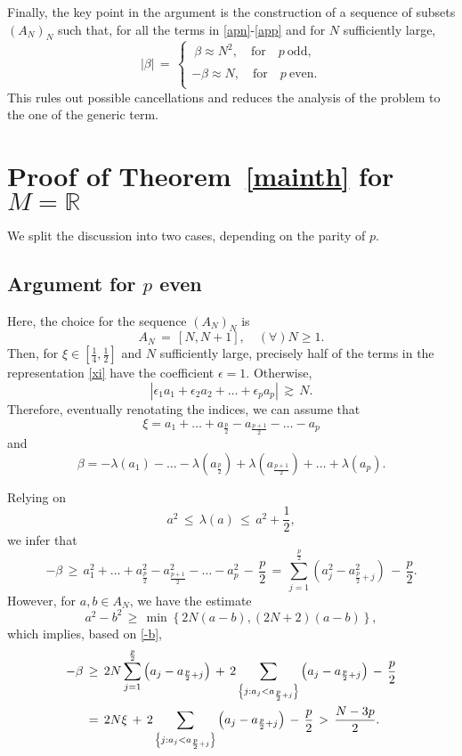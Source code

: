 \documentclass{amsart}
\newcommand{\R}{\mathbb{R}}
\begin{document}
Finally, the key point in the argument is the construction of a sequence of subsets $(A_N)_N$ such that, for all the terms in \eqref{apn}-\eqref{app} and for $N$ sufficiently large,
\begin{equation}
 |\beta|\,=\, \left\{
\begin{array}{l}
\ \beta \approx N^{2}, \quad \text{for} \quad p \ \text{odd},\\
\\
-\beta \approx N, \quad \text{for} \quad p \ \text{even}.\\
\end{array}\right.
\end{equation}
This rules out possible cancellations and reduces the analysis of the problem to the one of the generic term.

\section{Proof of Theorem~\ref{mainth} for $M=\R$}

We split the discussion into two cases, depending on the parity of $p$.

\subsection{Argument for $p$ even}
Here, the choice for the sequence $(A_N)_N$ is 
\[
A_N\,=\,[N,N+1], \quad (\forall) N \geq 1.
\]
Then, for $\xi \in \left[\frac{1}{4},\frac{1}{2}\right]$ and $N$ sufficiently large, precisely half of the terms in the representation \eqref{xi} have the coefficient $\epsilon =1$. Otherwise,
\[
\left|\epsilon_1 a_1+\epsilon_2 a_2+ \ldots+\epsilon_p a_p\right|\,\gtrsim\,N.\]
Therefore, eventually renotating the indices, we can assume that
\[
\xi=a_1+ \ldots+ a_{\frac p2} - a_{\frac{p+1}{2}}-\ldots-a_p 
\]
and 
\[
\beta=-\lambda(a_1)- \ldots- \lambda(a_{\frac p2}) + \lambda(a_{\frac{p+1}{2}})+\ldots+ \lambda(a_p). 
\]

Relying on 
\[
a^2\,\leq\,\lambda (a)\,\leq\, a^2 +\frac 12,
\]
we infer that
\begin{equation}
-\beta\,\geq\, a^2_1+ \ldots+ a^2_{\frac p2} - a^2_{\frac{p+1}{2}}-\ldots-a^2_p\,-\,\frac p2\,=\,\sum_{j=1}^{\frac p2} \left(a^2_j-a^2_{\frac{p}{2}+j}\right)\,-\,\frac p2. 
\label{-b}
\end{equation}
However, for $a,b \in A_N$, we have the estimate
\[
a^2-b^2\,\geq\,\min\left\{ 2N(a-b),(2N+2)(a-b)\right\},
\]
which implies, based on \eqref{-b},
\begin{equation}
\aligned
-\beta\,&\geq\, 2N \sum_{j=1}^{\frac p2} \left(a_j-a_{\frac{p}{2}+j}\right)\,+\, 2 \sum_{\left\{j: a_j< a_{\frac{p}{2}+j}\right\}} \left(a_j-a_{\frac{p}{2}+j}\right)\,-\,\frac p2\\
&=\,2N\xi\,+\, 2 \sum_{\left\{j: a_j< a_{\frac{p}{2}+j}\right\}} \left(a_j-a_{\frac{p}{2}+j}\right)\,-\,\frac p2\,>\,\frac{N-3p}{2}.\endaligned
\label{-bN}
\end{equation}
\end{document}
